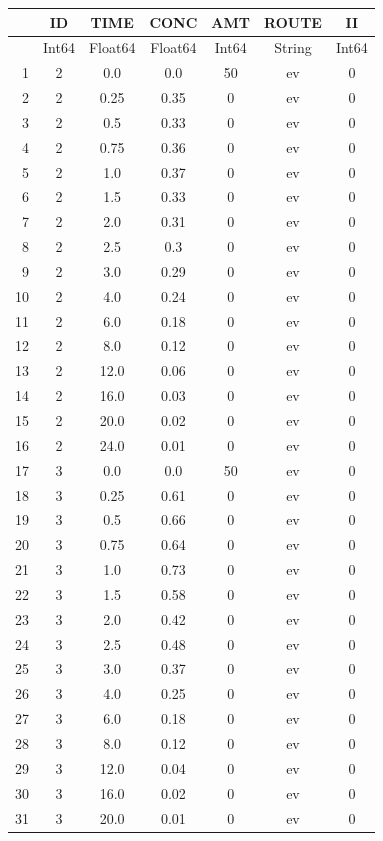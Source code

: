 \documentclass[12pt,a4paper]{article}
\begin{document}
\begin{tabular}{r|cccccc}
	& ID & TIME & CONC & AMT & ROUTE & II\\
	\hline
	& Int64 & Float64 & Float64 & Int64 & String & Int64\\
	\hline
	1 & 2 & 0.0 & 0.0 & 50 & ev & 0 \\
	2 & 2 & 0.25 & 0.35 & 0 & ev & 0 \\
	3 & 2 & 0.5 & 0.33 & 0 & ev & 0 \\
	4 & 2 & 0.75 & 0.36 & 0 & ev & 0 \\
	5 & 2 & 1.0 & 0.37 & 0 & ev & 0 \\
	6 & 2 & 1.5 & 0.33 & 0 & ev & 0 \\
	7 & 2 & 2.0 & 0.31 & 0 & ev & 0 \\
	8 & 2 & 2.5 & 0.3 & 0 & ev & 0 \\
	9 & 2 & 3.0 & 0.29 & 0 & ev & 0 \\
	10 & 2 & 4.0 & 0.24 & 0 & ev & 0 \\
	11 & 2 & 6.0 & 0.18 & 0 & ev & 0 \\
	12 & 2 & 8.0 & 0.12 & 0 & ev & 0 \\
	13 & 2 & 12.0 & 0.06 & 0 & ev & 0 \\
	14 & 2 & 16.0 & 0.03 & 0 & ev & 0 \\
	15 & 2 & 20.0 & 0.02 & 0 & ev & 0 \\
	16 & 2 & 24.0 & 0.01 & 0 & ev & 0 \\
	17 & 3 & 0.0 & 0.0 & 50 & ev & 0 \\
	18 & 3 & 0.25 & 0.61 & 0 & ev & 0 \\
	19 & 3 & 0.5 & 0.66 & 0 & ev & 0 \\
	20 & 3 & 0.75 & 0.64 & 0 & ev & 0 \\
	21 & 3 & 1.0 & 0.73 & 0 & ev & 0 \\
	22 & 3 & 1.5 & 0.58 & 0 & ev & 0 \\
	23 & 3 & 2.0 & 0.42 & 0 & ev & 0 \\
	24 & 3 & 2.5 & 0.48 & 0 & ev & 0 \\
	25 & 3 & 3.0 & 0.37 & 0 & ev & 0 \\
	26 & 3 & 4.0 & 0.25 & 0 & ev & 0 \\
	27 & 3 & 6.0 & 0.18 & 0 & ev & 0 \\
	28 & 3 & 8.0 & 0.12 & 0 & ev & 0 \\
	29 & 3 & 12.0 & 0.04 & 0 & ev & 0 \\
	30 & 3 & 16.0 & 0.02 & 0 & ev & 0 \\
	31 & 3 & 20.0 & 0.01 & 0 & ev & 0 \\

\end{tabular}
\end{document}
